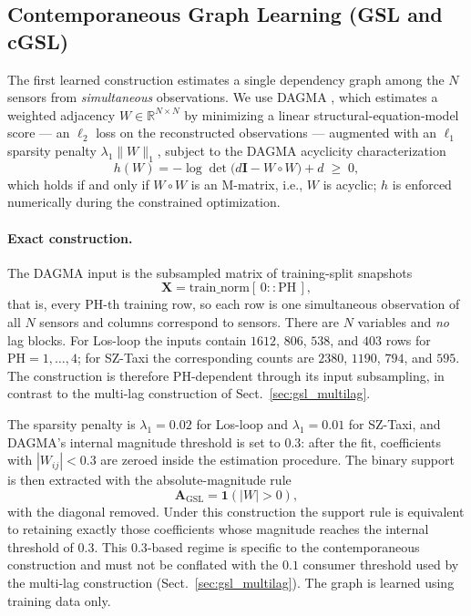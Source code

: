 \subsection{Contemporaneous Graph Learning (GSL and cGSL)}\label{sec:gsl_contemp}

The first learned construction estimates a single dependency graph among the
$N$ sensors from \emph{simultaneous} observations. We use DAGMA
\citep{Bello2024DAGMA}, which estimates a weighted adjacency $W\in\mathbb{R}^{N\times N}$
by minimizing a linear structural-equation-model score --- an $\ell_2$ loss on
the reconstructed observations --- augmented with an $\ell_1$ sparsity penalty
$\lambda_1\lVert W\rVert_1$, subject to the DAGMA acyclicity characterization
\[
h(W) = -\log\det\!\bigl(d\mathbf{I} - W\circ W\bigr) + d \;\geq\; 0,
\]
which holds if and only if $W\circ W$ is an M-matrix, i.e., $W$ is acyclic;
$h$ is enforced numerically during the constrained optimization.

\paragraph{Exact construction.}
The DAGMA input is the subsampled matrix of training-split snapshots
\[
\mathbf{X} = \mathrm{train\_norm}[\,0::\mathrm{PH}\,],
\]
that is, every $\mathrm{PH}$-th training row, so each row is one simultaneous
observation of all $N$ sensors and columns correspond to sensors. There are
$N$ variables and \emph{no} lag blocks. For Los-loop the inputs contain
$1612$, $806$, $538$, and $403$ rows for $\mathrm{PH}=1,\dots,4$; for SZ-Taxi
the corresponding counts are $2380$, $1190$, $794$, and $595$. The
construction is therefore PH-dependent through its input subsampling, in
contrast to the multi-lag construction of Sect.~\ref{sec:gsl_multilag}.

The sparsity penalty is $\lambda_1=0.02$ for Los-loop and $\lambda_1=0.01$ for
SZ-Taxi, and DAGMA's internal magnitude threshold is set to $0.3$: after the
fit, coefficients with $|W_{ij}|<0.3$ are zeroed inside the estimation
procedure. The binary support is then extracted with the absolute-magnitude
rule
\[
\mathbf{A}_{\mathrm{GSL}} = \mathbf{1}\!\left(|W|>0\right),
\]
with the diagonal removed. Under this construction the support rule is
equivalent to retaining exactly those coefficients whose magnitude reaches the
internal threshold of $0.3$. This $0.3$-based regime is specific to the
contemporaneous construction and must not be conflated with the $0.1$
consumer threshold used by the multi-lag construction
(Sect.~\ref{sec:gsl_multilag}). The graph is learned using training data only.

